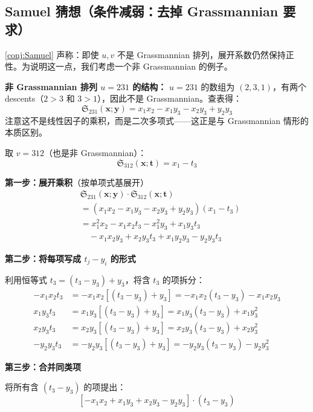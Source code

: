 \subsection{Samuel 猜想（条件减弱：去掉 Grassmannian 要求）}

\begin{Example}
\label{ex:SamuelConjectureExample}

\cref{conj:Samuel} 声称：即使 $u, v$ 不是 Grassmannian 排列，展开系数仍然保持正性。为说明这一点，我们考虑一个非 Grassmannian 的例子。

\textbf{非 Grassmannian 排列 $u = 231$ 的结构：}
$u = 231$ 的数组为 $(2,3,1)$，有两个 descents（$2>3$ 和 $3>1$），因此不是 Grassmannian。查表得：
$$\mathfrak{S}_{231}(\mathbf{x}; \mathbf{y}) = x_1 x_2 - x_1 y_3 - x_2 y_3 + y_2 y_3$$
注意这不是线性因子的乘积，而是二次多项式——这正是与 Grassmannian 情形的本质区别。

取 $v = 312$（也是非 Grassmannian）：
$$\mathfrak{S}_{312}(\mathbf{x}; \mathbf{t}) = x_1 - t_3$$

\textbf{第一步：展开乘积}（按单项式基展开）
\begin{align}
&\mathfrak{S}_{231}(\mathbf{x}; \mathbf{y}) \cdot \mathfrak{S}_{312}(\mathbf{x}; \mathbf{t}) \label{eq:u231-v312-product} \\
&= (x_1 x_2 - x_1 y_3 - x_2 y_3 + y_2 y_3)(x_1 - t_3) \label{eq:u231-v312-expand1} \\
&= x_1^2 x_2 - x_1 x_2t_3 - x_1^2y_3 + x_1 y_3t_3 \label{eq:u231-v312-expand2} \\
&\quad - x_1 x_2 y_3 + x_2 y_3t_3 + x_1y_2 y_3 - y_2 y_3t_3 \label{eq:u231-v312-full}
\end{align}

\textbf{第二步：将每项写成 $t_j - y_i$ 的形式}

利用恒等式 $t_3 = (t_3 - y_3) + y_3$，将含 $t_3$ 的项拆分：
\begin{align*}
-x_1 x_2t_3 &= -x_1 x_2[(t_3 - y_3) + y_3] = -x_1 x_2(t_3 - y_3) - x_1 x_2 y_3 \\
x_1 y_3t_3 &= x_1 y_3[(t_3 - y_3) + y_3] = x_1 y_3(t_3 - y_3) + x_1 y_3^2 \\
x_2 y_3t_3 &= x_2 y_3[(t_3 - y_3) + y_3] = x_2 y_3(t_3 - y_3) + x_2 y_3^2 \\
-y_2 y_3t_3 &= -y_2 y_3[(t_3 - y_3) + y_3] = -y_2 y_3(t_3 - y_3) - y_2 y_3^2
\end{align*}

\textbf{第三步：合并同类项}

将所有含 $(t_3 - y_3)$ 的项提出：
$$[-x_1 x_2 + x_1 y_3 + x_2 y_3 - y_2 y_3] \cdot (t_3 - y_3)$$


\end{Example}
